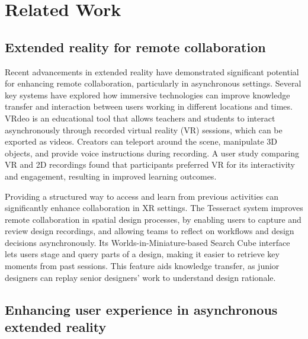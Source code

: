 \section{Related Work}
\subsection{Extended reality for remote collaboration}

Recent advancements in extended reality have demonstrated significant potential for enhancing remote collaboration, particularly in asynchronous settings. Several key systems have explored how immersive technologies can improve knowledge transfer and interaction between users working in different locations and times. VRdeo \cite{bruuvza2021vrdeo} is an educational tool that allows teachers and students to interact asynchronously through recorded virtual reality (VR) sessions, which can be exported as videos. Creators can teleport around the scene, manipulate 3D objects, and provide voice instructions during recording. A user study comparing VR and 2D recordings found that participants preferred VR for its interactivity and engagement, resulting in improved learning outcomes.

Providing a structured way to access and learn from previous activities can significantly enhance collaboration in XR settings. The Tesseract system \cite{mahadevan2023tesseract} improves remote collaboration in spatial design processes, by enabling users to capture and review design recordings, and allowing teams to reflect on workflows and design decisions asynchronously. Its Worlds-in-Miniature-based Search Cube interface lets users stage and query parts of a design, making it easier to retrieve key moments from past sessions. This feature aids knowledge transfer, as junior designers can replay senior designers' work to understand design rationale. 

\subsection{Enhancing user experience in asynchronous extended reality}

